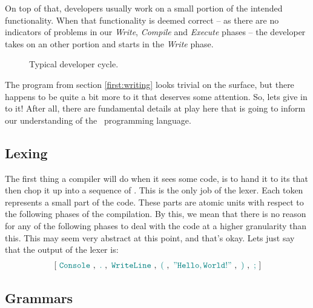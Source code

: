 On top of that, developers usually work on a small portion of the intended functionality. When that functionality is deemed correct -- as there are no indicators of problems in our \textsl{Write}, \textsl{Compile} and \textsl{Execute} phases -- the developer takes on an other portion and starts in the \textsl{Write} phase.

\begin{figure}[tbp]
  
  \caption{Typical developer cycle.}
  \label{fig:first:phases:cycle}
\end{figure}

\csharpsection{\csharp}

The program from section \ref{first:writing} looks trivial on the surface, but there happens to be quite a bit more to it that deserves some attention. So, lets give in to it! After all, there are fundamental details at play here that is going to inform our understanding of the \csharp\ programming language.

\subsection{Lexing}

The first thing a compiler will do when it sees some code, is to hand it to its  that then chop it up into a sequence of . This is the only job of the lexer. Each token represents a small part of the code. These parts are atomic units with respect to the following phases of the compilation. By this, we mean that there is no reason for any of the following phases to deal with the code at a higher granularity than this. This may seem very abstract at this point, and that's okay. Lets just say that the output of the lexer is:
\begin{eqnarray*}
  \left[
    ~ \textcolor{teal}{\mathtt{Console}} ~
    ,
    ~ \textcolor{teal}{\mathtt{.}} ~
    ,
    ~ \textcolor{teal}{\mathtt{WriteLine}} ~
    ,
    ~ \textcolor{teal}{\mathtt{(}} ~
    ,
    ~ \textcolor{teal}{\mathtt{"Hello, World!"}} ~
    ,
    ~ \textcolor{teal}{\mathtt{)}} ~
    ,
    ~ \textcolor{teal}{\mathtt{;}} ~
  \right]
\end{eqnarray*}



\subsection{Grammars}

